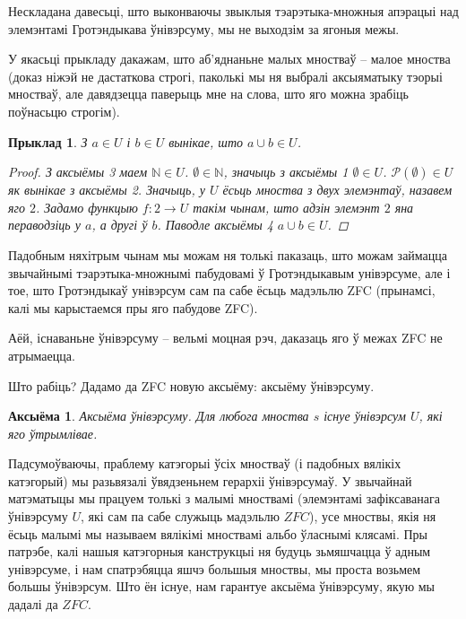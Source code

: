 \documentclass[a4paper,12pt]{book}
\newtheorem{example}{Прыклад}[section]
\newtheorem{axiom}{Аксыёма}[section]
\begin{document}
Нескладана давесьці, што выконваючы звыклыя тэарэтыка-множныя апэрацыі
над элемэнтамі Гротэндыкава ўнівэрсуму, мы не выходзім за ягоныя межы.

У якасьці прыкладу дакажам, што аб'яднаньне малых мностваў -- малое
мноства (доказ ніжэй не дастаткова строгі, паколькі мы ня выбралі
аксыяматыку тэорыі мностваў, але давядзецца паверыць мне на слова, што
яго можна зрабіць поўнасьцю строгім).

\begin{example}
  З $a \in U$ і $b \in U$ вынікае, што $a \cup b \in U$.

  \begin{proof}
    З аксыёмы 3 маем $\mathbb{N} \in U$. $\emptyset \in \mathbb{N}$,
    значыць з аксыёмы 1 $\emptyset \in U$. $\mathcal{P}(\emptyset) \in
    U$ як вынікае з аксыёмы 2. Значыць, у $U$ ёсьць мноства з двух
    элемэнтаў, назавем яго $2$. Задамо функцыю $f: 2 \rightarrow U$
    такім чынам, што адзін элемэнт $2$ яна пераводзіць у $a$, а другі
    ў $b$. Паводле аксыёмы 4 $a \cup b \in U$.
  \end{proof}
\end{example}

Падобным няхітрым чынам мы можам ня толькі паказаць, што можам
займацца звычайнымі тэарэтыка-множнымі пабудовамі ў Гротэндыкавым
унівэрсуме, але і тое, што Гротэндыкаў унівэрсум сам па сабе ёсьць
мадэльлю ZFC (прынамсі, калі мы карыстаемся пры яго пабудове ZFC).

Аёй, існаваньне ўнівэрсуму -- вельмі моцная рэч, даказаць яго ў межах
ZFC не атрымаецца.

Што рабіць? Дадамо да ZFC новую аксыёму: аксыёму ўнівэрсуму.

\begin{axiom}
  Аксыёма ўнівэрсуму. Для любога мноства $s$ існуе ўнівэрсум $U$, які яго ўтрымлівае.
\end{axiom}

Падсумоўваючы, праблему катэгорыі ўсіх мностваў (і падобных вялікіх
катэгорый) мы разьвязалі ўвядзеньнем герархіі ўнівэрсумаў. У звычайнай
матэматыцы мы працуем толькі з малымі мноствамі (элемэнтамі
зафіксаванага ўнівэрсуму $U$, які сам па сабе служыць мадэльлю $ZFC$),
усе мноствы, якія ня
ёсьць малымі мы называем вялікімі мноствамі альбо ўласнымі клясамі. Пры
патрэбе, калі нашыя катэгорныя канструкцыі ня будуць зьмяшчацца ў
адным унівэрсуме, і нам спатрэбяцца яшчэ большыя мноствы, мы проста
возьмем большы ўнівэрсум. Што ён існуе, нам гарантуе аксыёма
ўнівэрсуму, якую мы дадалі да $ZFC$.
\end{document}
